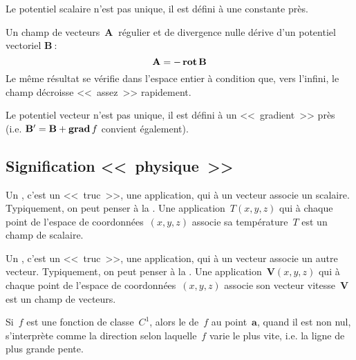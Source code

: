 Le potentiel scalaire n'est pas unique, il est défini à une constante près.

\medskip
Un champ de vecteurs~$\mathbf{A}~$ régulier et de divergence nulle dérive d'un potentiel vectoriel
$\mathbf{B}~$:
\begin{equation}
  \mathbf{A} = -\operatorname{\mathbf{rot}} \mathbf{B}
\end{equation}
Le même résultat se vérifie dans l'espace entier à condition que, vers l'infini, le champ
décroisse <<~assez~>> rapidement.

Le potentiel vecteur n'est pas unique, il est défini à un <<~gradient~>> près (i.e.
$ \mathbf{B} ' = \mathbf{B} + \operatorname{\mathbf{grad}} f$ convient
également).

\medskip
\subsection{Signification <<~physique~>>}

Un , c'est un <<~truc~>>, une application, qui à un vecteur
associe un scalaire. Typiquement, on peut penser à la .
Une application~$T(x,y,z)$ qui à chaque point de l'espace de coordonnées~$(x,y,z)$ associe
sa température~$T$ est un champ de scalaire.

Un , c'est un <<~truc~>>, une application, qui à un vecteur
associe un autre vecteur. Typiquement, on peut penser à la .
Une application~$\mathbf{V}(x,y,z)$ qui à chaque point de l'espace de coordonnées~$(x,y,z)$
associe son vecteur vitesse~$\mathbf{V}$ est un champ de vecteurs.

\medskip
Si~$f$ est une fonction de classe~$C^1$, alors le  de~$f$ au point~$\mathbf{a}$,
quand il est non nul, s'interprète comme la direction selon laquelle~$f$ varie le plus vite,
i.e. la ligne de plus grande pente.


